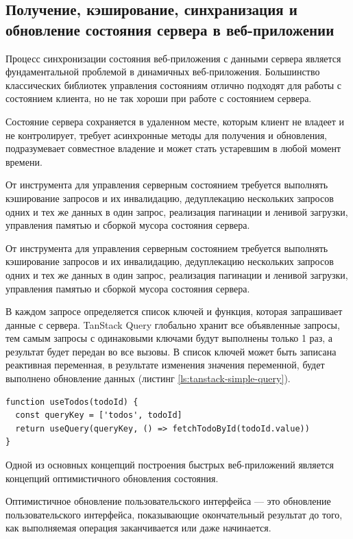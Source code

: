 \subsection{Получение, кэширование, синхранизация и обновление состояния сервера в веб-приложении}

Процесс синхронизации состояния веб-приложения с данными сервера является фундаментальной проблемой в динамичных веб-приложения. Большинство классических библиотек управления состояниям отлично подходят для работы с состоянием клиента, но не так хороши при работе с состоянием сервера.

Состояние сервера сохраняется в удаленном месте, которым клиент не владеет и не контролирует, требует асинхронные методы для получения и обновления, подразумевает совместное владение и может стать устаревшим в любой момент времени.

От инструмента для управления серверным состоянием требуется выполнять кэширование запросов и их инвалидацию, дедуплекацию нескольких запросов одних и тех же данных в один запрос, реализация пагинации и ленивой загрузки, управления памятью и сборкой мусора состояния сервера.

От инструмента для управления серверным состоянием требуется выполнять кэширование запросов и их инвалидацию, дедуплекацию нескольких запросов одних и тех же данных в один запрос, реализация пагинации и ленивой загрузки, управления памятью и сборкой мусора состояния сервера.

В каждом запросе определяется список ключей и функция, которая запрашивает данные с сервера. TanStack Query глобально хранит все объявленные запросы, тем самым запросы с одинаковыми ключами будут выполнены только 1 раз, а результат будет передан во все вызовы. В список ключей может быть записана реактивная переменная, в результате изменения значения переменной, будет выполнено обновление данных (листинг \ref{ls:tanstack-simple-query}).

\begin{lstlisting}[caption={Пример запроса с реактивной переменной в качестве ключа}, label={ls:tanstack-simple-query}]
function useTodos(todoId) {
  const queryKey = ['todos', todoId]
  return useQuery(queryKey, () => fetchTodoById(todoId.value))
}
\end{lstlisting}

Одной из основных концепций построения быстрых веб-приложений является концепций оптимистичного обновления состояния.

Оптимистичное обновление пользовательского интерфейса — это обновление пользовательского интерфейса, показывающие окончательный результат до того, как выполняемая операция заканчивается или даже начинается.

